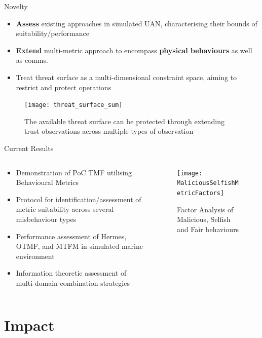 \documentclass{beamer}
\begin{document}
\begin{frame}{Novelty}
	\begin{itemize}
		\item \textbf{Assess} existing approaches in simulated UAN, characterising their bounds of suitability/performance
		\item \textbf{Extend} multi-metric approach to encompass \textbf{physical behaviours} as well as comms.
		\item Treat threat surface as a multi-dimensional constraint space, aiming to restrict and protect operations
	\end{itemize}

	\begin{figure}[h]
		\centering
		\texttt{[image: threat\_surface\_sum]}
		\caption{The available threat surface can be protected through extending trust observations across multiple types of observation}
	\end{figure}
	
\end{frame}
\begin{frame}{Current Results}

	\begin{columns}[T]
		\begin{column}{0.6\textwidth}
			\begin{itemize}
				\item Demonstration of PoC TMF utilising Behavioural Metrics
				\item Protocol for identification/assessment of metric suitability across several misbehaviour types
				\item Performance assessment of Hermes, OTMF, and MTFM in simulated marine environment
				\item Information theoretic assessment of multi-domain combination strategies
			\end{itemize}
			
		\end{column}
		\begin{column}{0.4\textwidth}
			\begin{figure}
				\centering
				\texttt{[image: MaliciousSelfishMetricFactors]}
				\caption{Factor Analysis of Malicious, Selfish and Fair behaviours}
				\label{fig:malselfactors}
			\end{figure}
		\end{column}
	\end{columns}
\end{frame}

\section{Impact}
\end{document}
